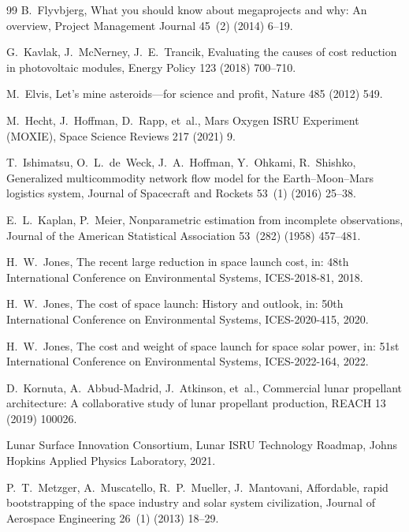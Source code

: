 \documentclass[preprint,12pt]{elsarticle}
\begin{document}
\begin{thebibliography}{99}
B.~Flyvbjerg,
\newblock What you should know about megaprojects and why: An overview,
\newblock Project Management Journal 45~(2) (2014) 6--19.

G.~Kavlak, J.~McNerney, J.~E.~Trancik,
\newblock Evaluating the causes of cost reduction in photovoltaic modules,
\newblock Energy Policy 123 (2018) 700--710.

M.~Elvis,
\newblock Let's mine asteroids---for science and profit,
\newblock Nature 485 (2012) 549.

M.~Hecht, J.~Hoffman, D.~Rapp, et~al.,
\newblock Mars Oxygen ISRU Experiment (MOXIE),
\newblock Space Science Reviews 217 (2021) 9.

T.~Ishimatsu, O.~L.~de~Weck, J.~A.~Hoffman, Y.~Ohkami, R.~Shishko,
\newblock Generalized multicommodity network flow model for the Earth--Moon--Mars logistics system,
\newblock Journal of Spacecraft and Rockets 53~(1) (2016) 25--38.

E.~L.~Kaplan, P.~Meier,
\newblock Nonparametric estimation from incomplete observations,
\newblock Journal of the American Statistical Association 53~(282) (1958) 457--481.

H.~W.~Jones,
\newblock The recent large reduction in space launch cost,
\newblock in: 48th International Conference on Environmental Systems, ICES-2018-81, 2018.

H.~W.~Jones,
\newblock The cost of space launch: History and outlook,
\newblock in: 50th International Conference on Environmental Systems, ICES-2020-415, 2020.

H.~W.~Jones,
\newblock The cost and weight of space launch for space solar power,
\newblock in: 51st International Conference on Environmental Systems, ICES-2022-164, 2022.

D.~Kornuta, A.~Abbud-Madrid, J.~Atkinson, et~al.,
\newblock Commercial lunar propellant architecture: A collaborative study of lunar propellant production,
\newblock REACH 13 (2019) 100026.

Lunar Surface Innovation Consortium,
\newblock Lunar ISRU Technology Roadmap,
\newblock Johns Hopkins Applied Physics Laboratory, 2021.

P.~T.~Metzger, A.~Muscatello, R.~P.~Mueller, J.~Mantovani,
\newblock Affordable, rapid bootstrapping of the space industry and solar system civilization,
\newblock Journal of Aerospace Engineering 26~(1) (2013) 18--29.


\end{thebibliography}
\end{document}
